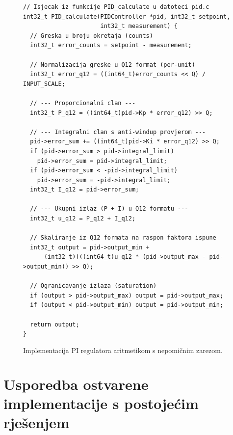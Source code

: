 \documentclass[diplomskirad]{fer}
\begin{document}
\begin{figure}[h!]
	\begin{verbatim}
// Isjecak iz funkcije PID_calculate u datoteci pid.c
int32_t PID_calculate(PIDController *pid, int32_t setpoint,
                      int32_t measurement) {
  // Greska u broju okretaja (counts)
  int32_t error_counts = setpoint - measurement;

  // Normalizacija greske u Q12 format (per-unit)
  int32_t error_q12 = ((int64_t)error_counts << Q) / INPUT_SCALE;

  // --- Proporcionalni clan ---
  int32_t P_q12 = ((int64_t)pid->Kp * error_q12) >> Q;

  // --- Integralni clan s anti-windup provjerom ---
  pid->error_sum += ((int64_t)pid->Ki * error_q12) >> Q;
  if (pid->error_sum > pid->integral_limit)
    pid->error_sum = pid->integral_limit;
  if (pid->error_sum < -pid->integral_limit)
    pid->error_sum = -pid->integral_limit;
  int32_t I_q12 = pid->error_sum;

  // --- Ukupni izlaz (P + I) u Q12 formatu ---
  int32_t u_q12 = P_q12 + I_q12;

  // Skaliranje iz Q12 formata na raspon faktora ispune
  int32_t output = pid->output_min + 
      (int32_t)(((int64_t)u_q12 * (pid->output_max - pid->output_min)) >> Q);

  // Ogranicavanje izlaza (saturation)
  if (output > pid->output_max) output = pid->output_max;
  if (output < pid->output_min) output = pid->output_min;

  return output;
}
\end{verbatim}
	\caption{Implementacija PI regulatora aritmetikom s nepomičnim zarezom.}
	\label{code:pi_impl}
\end{figure}



\chapter{Usporedba ostvarene implementacije s postojećim rješenjem}
\label{pog:usporedba}
\end{document}

